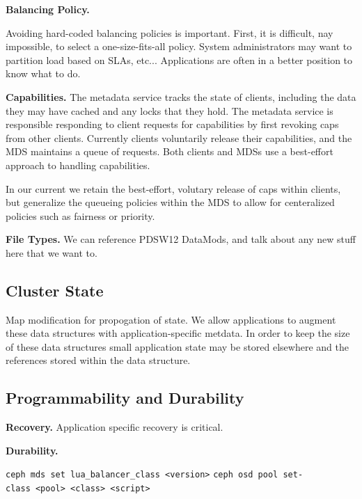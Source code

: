 \documentclass[10pt,twocolumn]{article}
\begin{document}
%

{\bf Balancing Policy.}

Avoiding hard-coded balancing policies is important. First, it is difficult,
nay impossible, to select a one-size-fits-all policy. System administrators
may want to partition load based on SLAs, etc... Applications are often in
a better position to know what to do.

{\bf Capabilities.}
The metadata service tracks the state of clients, including the data they
may have cached and any locks that they hold. The metadata service is
responsible responding to client requests for capabilities by first
revoking caps from other clients. Currently clients voluntarily
release their capabilities, and the MDS maintains a queue of requests.
Both clients and MDSs use a best-effort approach to handling capabilities.

In our current we retain the best-effort, volutary release of caps within
clients, but generalize the queueing policies within the MDS to allow for
centeralized policies such as fairness or priority.

{\bf File Types.}
We can reference PDSW12 DataMods, and talk about any new stuff here that we
want to.

\subsection{Cluster State}

Map modification for propogation of state. We allow applications to augment
these data structures with application-specific metdata. In order to keep the
size of these data structures small application state may be stored elsewhere
and the references stored within the data structure.

\subsection{Programmability and Durability}

{\bf Recovery.}
Application specific recovery is critical.

{\bf Durability.}

\noindent \texttt{ceph\ mds\ set\ lua\_balancer\_class\ \textless{}version\textgreater{}}
\noindent \texttt{ceph\ osd\ pool\ set-class\ \textless{}pool\textgreater{}\ \textless{}class\textgreater{}\ \textless{}script\textgreater{}}
\end{document}
